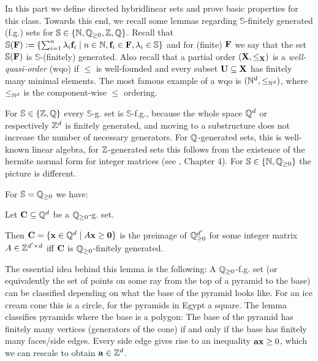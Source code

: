 In this part we define directed hybridlinear sets and prove basic properties for this class. Towards this end, we recall some lemmas regarding \(\mathbb{S}\)-finitely generated (f.g.) sets for \(\mathbb{S} \in \{\mathbb{N}, \mathbb{Q}_{\geq 0}, \mathbb{Z}, \mathbb{Q}\}\). Recall that \(\mathbb{S}(\mathbf{F}):=\{ \sum_{i=1}^n \lambda_i \mathbf{f}_i \mid n \in \mathbb{N}, \mathbf{f}_i \in \mathbf{F}, \lambda_i \in \mathbb{S}\}\) and for (finite) $\mathbf{F}$ we say that the set \(\mathbb{S}(\mathbf{F})\) is \(\mathbb{S}\)-(finitely) generated. Also recall that a partial order \((\mathbf{X}, \leq_{\mathbf{X}})\) is a \emph{well-quasi-order} (wqo) if \(\leq\) is well-founded and every subset \(\mathbf{U} \subseteq \mathbf{X}\) has finitely many minimal elements. The most famous example of a wqo is \((\mathbb{N}^d, \leq_{\mathbb{N}^d})\), where \(\leq_{\mathbb{N}^d}\) is the component-wise \(\leq\) ordering.

For \(\mathbb{S} \in \{\mathbb{Z}, \mathbb{Q}\}\) every \(\mathbb{S}\)-g. set is \(\mathbb{S}\)-f.g., because the whole space \(\mathbb{Q}^d\) or respectively \(\mathbb{Z}^d\) is finitely generated, and moving to a substructure does not increase the number of necessary generators. For \(\mathbb{Q}\)-generated sets, this is well-known linear algebra, for \(\mathbb{Z}\)-generated sets this follows from the existence of the hermite normal form for integer matrices (see \cite{LinearProgramming}, Chapter 4). For \(\mathbb{S} \in \{\mathbb{N}, \mathbb{Q}_{\geq 0}\}\) the picture is different. 

For \(\mathbb{S} = \mathbb{Q}_{\geq 0}\) we have:

\begin{lemma}

Let \(\mathbf{C} \subseteq \mathbb{Q}^d\) be a \(\mathbb{Q}_{\geq 0}\)-g. set.

Then \(\mathbf{C}=\{\mathbf{x} \in \mathbb{Q}^d \mid A \mathbf{x} \geq \mathbf{0}\}\) is the preimage of \(\mathbb{Q}_{\geq 0}^{d'}\) for some integer matrix \(A \in \mathbb{Z}^{d' \times d}\) iff \(\mathbf{C}\) is \(\mathbb{Q}_{\geq 0}\)-finitely generated.\label{LemmaFinitelyGeneratedCone}%
\end{lemma}

The essential idea behind this lemma is the following: A \(\mathbb{Q}_{\geq 0}\)-f.g. set (or equivalently the set of points on some ray from the top of a pyramid to the base) can be classified depending on what the base of the pyramid looks like. For an ice cream cone this is a circle, for the pyramids in Egypt a square. The lemma classifies pyramids where the base is a polygon: The base of the pyramid has finitely many vertices (generators of the cone) if and only if the base has finitely many faces/side edges. Every side edge gives rise to an inequality \(\mathbf{a} \mathbf{x} \geq 0\), which we can rescale to obtain \(\mathbf{a} \in \mathbb{Z}^d\).

